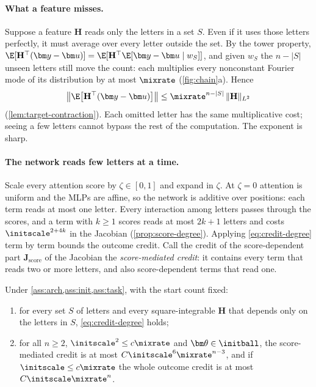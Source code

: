 \paragraph{What a feature misses.} Suppose a feature $\mathbf H$ reads only the letters in a set $S$. Even if it uses those letters perfectly,
it must average over every letter outside the set. By the tower property,
$\E[\mathbf H^\top(\bm y-\bm u)]=\E[\mathbf H^\top\E[\bm y-\bm u\mid w_S]]$, and given $w_S$ the $n-|S|$ unseen letters still move the count: each
multiplies every nonconstant Fourier mode of its distribution by at most $\mixrate$ (\cref{fig:chain}a). Hence
\begin{equation}
 \bigl\|\E\bigl[\mathbf H^\top(\bm y-\bm u)\bigr]\bigr\|\le\mixrate^{n-|S|}\,\|\mathbf H\|_{L^2}
 \label{eq:credit-degree}
\end{equation}
(\cref{lem:target-contraction}). Each omitted letter has the same multiplicative cost; seeing a few letters cannot bypass the rest of
the computation. The exponent is sharp.

\paragraph{The network reads few letters at a time.} Scale every attention score by $\zeta\in[0,1]$ and expand in $\zeta$. At $\zeta=0$ attention is uniform
and the MLPs are affine, so the network is additive over positions: each term reads at most one letter. Every interaction among letters
passes through the scores, and a term with $k\ge1$ scores reads at most $2k+1$ letters and costs $\initscale^{2+4k}$ in the Jacobian
(\cref{prop:score-degree}). Applying \cref{eq:credit-degree} term by term bounds the outcome credit. Call the credit of the score-dependent part
$\mathbf J_{\mathrm{score}}$ of the Jacobian the \emph{score-mediated credit}: it contains every term that reads two or more letters, and
also score-dependent terms that read one.

\begin{theorem}
\label{thm:main}
Under \cref{ass:arch,ass:init,ass:task}, with the start count fixed:
\begin{enumerate}[label=(\roman*),leftmargin=*,itemsep=0pt,topsep=2pt]
\item for every set $S$ of letters and every square-integrable $\mathbf H$ that depends only on the letters in $S$, \cref{eq:credit-degree} holds;
\item for all $n\ge2$, $\initscale^2\le c\mixrate$ and $\bm\theta\in\initball$, the score-mediated credit is at most $C\initscale^6\mixrate^{n-3}$, and if
$\initscale\le c\mixrate$ the whole outcome credit is at most $C\initscale\mixrate^n$.
\end{enumerate}
\end{theorem}

